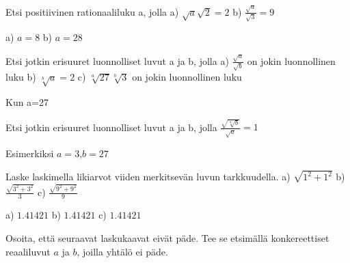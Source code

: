 \begin{tehtavasivu}
\begin{tehtava} Etsi positiivinen rationaaliluku a, jolla
a) $\sqrt{a} \sqrt{2} = 2$  \quad b)   $ \frac {\sqrt{a}}{\sqrt{3}} =9 $   \quad 
\begin{vastaus}
a) $a=8$ \quad b) $a=28$ \quad 
\end{vastaus}
\end{tehtava}

\begin{tehtava} Etsi jotkin erisuuret luonnolliset luvut a ja b, jolla 
a) $\frac{\sqrt{a}}{\sqrt{b}}$ on jokin luonnollinen luku  \quad b) $\sqrt[b]{a}=2 $   \quad  c) $\sqrt[a]{27}\sqrt[b]{3}$ on jokin luonnollinen luku
\begin{vastaus}
Kun a=27 
\end{vastaus}
\end{tehtava}

\begin{tehtava} Etsi jotkin erisuuret luonnolliset luvut a ja b, jolla 
$\frac{\sqrt{\sqrt[a]{b}}}{\sqrt{a}}=1$ 
\begin{vastaus}
Esimerkiksi $a=3$,\quad $b=27$ 
\end{vastaus}
\end{tehtava}

\begin{tehtava} Laske laskimella likiarvot viiden merkitsevän luvun tarkkuudella. 
a) $ \sqrt{1^2+1^2}$ \quad b)  $ \frac {\sqrt{3^2+3^2}}{3}$    \quad c)  $ \frac {\sqrt{9^2+9^2}}{9}$  \quad 
\begin{vastaus}
a) $1.41421$ \quad b) $1.41421$ \quad c) $1.41421$ \quad
\end{vastaus}
\end{tehtava}


\begin{tehtava}
Osoita, että seuraavat laskukaavat eivät päde. Tee se etsimällä konkereettiset reaaliluvut $a$ ja $b$, joilla yhtälö ei päde.
        \begin{alakohdat}
        \end{alakohdat}
        

\end{tehtava}
\end{tehtavasivu}
